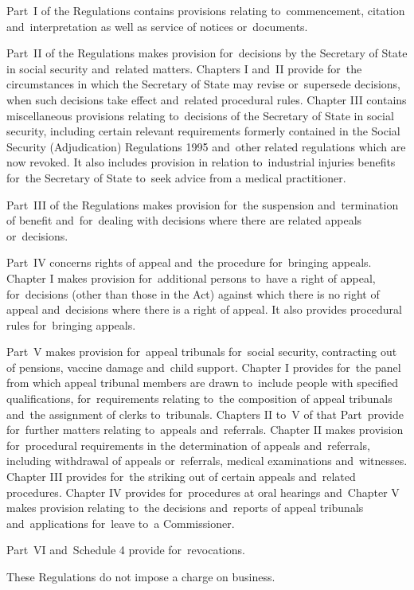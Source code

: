 \documentclass[12pt,a4paper]{article}
\begin{document}
  Part~I of the Regulations contains provisions relating to~commencement, citation and~interpretation as well as service of notices or~documents.

  Part~II of the Regulations makes provision for~decisions by the Secretary of State in social security and~related matters. Chapters I and~II provide for~the circumstances in which the Secretary of State may revise or~supersede decisions, when such decisions take effect and~related procedural rules. Chapter III contains miscellaneous provisions relating to~decisions of the Secretary of State in social security, including certain relevant requirements formerly contained in the Social Security (Adjudication) Regulations 1995 and~other related regulations which are now revoked. It also includes provision in relation to~industrial injuries benefits for~the Secretary of State to~seek advice from a medical practitioner.

  Part~III of the Regulations makes provision for~the suspension and~termination of benefit and~for~dealing with decisions where there are related appeals or~decisions.

  Part~IV concerns rights of appeal and~the procedure for~bringing appeals. Chapter I makes provision for~additional persons to~have a right of appeal, for~decisions (other than those in the Act) against which there is no right of appeal and~decisions where there is a right of appeal. It also provides procedural rules for~bringing appeals.

  Part~V makes provision for~appeal tribunals for~social security, contracting out of pensions, vaccine damage and~child support. Chapter I provides for~the panel from which appeal tribunal members are drawn to~include people with specified qualifications, for~requirements relating to~the composition of appeal tribunals and~the assignment of clerks to~tribunals. Chapters II to~V of that Part~provide for~further matters relating to~appeals and~referrals. Chapter II makes provision for~procedural requirements in the determination of appeals and~referrals, including withdrawal of appeals or~referrals, medical examinations and~witnesses. Chapter III provides for~the striking out of certain appeals and~related procedures. Chapter IV provides for~procedures at oral hearings and~Chapter V makes provision relating to~the decisions and~reports of appeal tribunals and~applications for~leave to~a Commissioner.

  Part~VI and~Schedule 4 provide for~revocations.

  These Regulations do not impose a charge on business.
\end{document}
